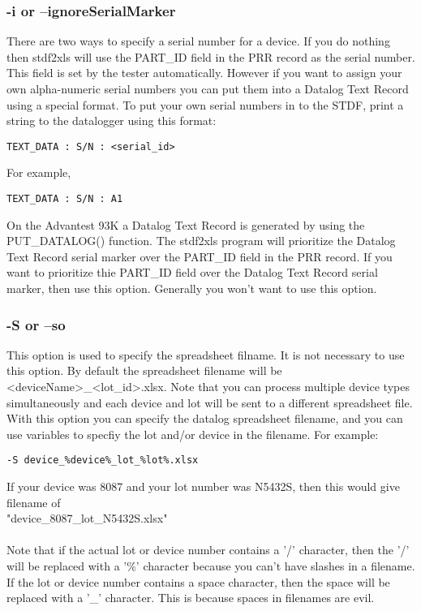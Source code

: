 \documentclass[letterpaper]{article}
\begin{document}
\subsubsection{\bf -i or --ignoreSerialMarker}
There are two ways to specify a serial number for a device.  If you do nothing then stdf2xls
will use the PART\_ID field in the PRR record as the serial number.  This field is set by the tester
automatically. However if you want to assign your own alpha-numeric serial numbers you can put
them into a Datalog Text Record using a special format.  To put your own serial numbers
in to the STDF, print a string to the datalogger using this format:
\begin{verbatim}
TEXT_DATA : S/N : <serial_id>
\end{verbatim}
For example,
\begin{verbatim}
TEXT_DATA : S/N : A1
\end{verbatim}
On the Advantest 93K a Datalog Text Record is generated by using the PUT\_DATALOG() function.
The stdf2xls program will prioritize the Datalog Text Record serial marker over the
PART\_ID field in the PRR record.  If you want to prioritize thie PART\_ID field over
the Datalog Text Record serial marker, then use this option.  Generally you won't want
to use this option.

\subsubsection{\bf -S or --so}
This option is used to specify the spreadsheet filname.  It is not necessary to use this option.
By default the spreadsheet filename will be <deviceName>\_<lot\_id>.xlsx.  Note that you can process
multiple device types simultaneously and each device and lot will be sent to a different spreadsheet
file.  With this option you can specify the datalog spreadsheet filename, and you can use variables
to specfiy the lot and/or device in the filename.  For example:
\begin{verbatim}
-S device_%device%_lot_%lot%.xlsx
\end{verbatim}
If your device was 8087 and your lot number was N5432S, then this would
give filename of\\ "device\_8087\_lot\_N5432S.xlsx"\\\\   Note that if the actual lot or device
number contains a '/' character, then the '/' will be replaced with a '\%' character
because you can't have slashes in a filename.  If the lot or device number contains
a space character, then the space will be replaced with a '\_' character.  This is because
spaces in filenames are evil.
\end{document}
